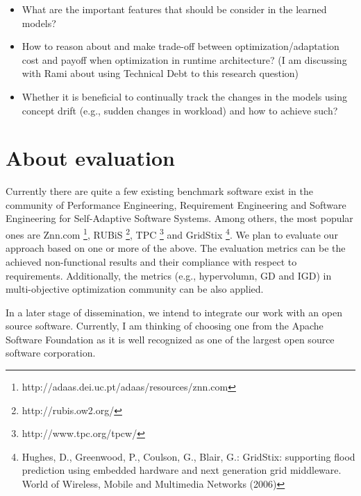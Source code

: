 \documentclass[DIV15,a4paper]{scrartcl}
\begin{document}
\begin{itemize}

\item What are the important features that should be consider in the learned models?


\item How to reason about and make trade-off between optimization/adaptation cost and payoff when optimization in runtime architecture? (I am discussing with Rami about using Technical Debt to this research question)

\item Whether it is beneficial to continually track the changes in the models using concept drift (e.g., sudden changes in workload) and how to achieve such?
\end{itemize}

\section{About evaluation}

Currently there are quite a few existing benchmark software exist in the community of Performance Engineering, Requirement Engineering and Software Engineering for Self-Adaptive Software Systems. Among others, the most popular ones are Znn.com \footnote{http://adaas.dei.uc.pt/adaas/resources/znn.com}, RUBiS \footnote{http://rubis.ow2.org/}, TPC \footnote{http://www.tpc.org/tpcw/} and GridStix \footnote{Hughes, D., Greenwood, P., Coulson, G., Blair, G.: GridStix: supporting flood prediction using embedded hardware and next generation grid middleware. World of Wireless, Mobile and Multimedia Networks (2006)}. We plan to evaluate our approach based on one or more of the above. The evaluation metrics can be the achieved non-functional results and their compliance with respect to requirements. Additionally, the metrics (e.g., hypervolumn, GD and IGD) in multi-objective optimization community can be also applied.

In a later stage of dissemination, we intend to integrate our work with an open source software. Currently, I am thinking of choosing one from the Apache Software Foundation as it is well recognized as one of the largest open source software corporation.



\end{document}
